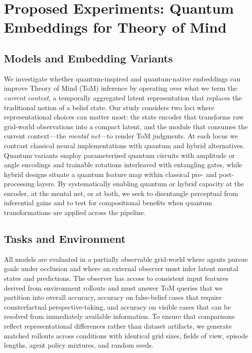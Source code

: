 \section{Proposed Experiments: Quantum Embeddings for Theory of Mind}
\label{sec:experiments}

\subsection{Models and Embedding Variants}
We investigate whether quantum-inspired and quantum-native embeddings can improve Theory of Mind (ToM) inference by operating over what we term the \emph{current context}, a temporally aggregated latent representation that replaces the traditional notion of a belief state. Our study considers two loci where representational choices can matter most: the state encoder that transforms raw grid-world observations into a compact latent, and the module that consumes the current context---the \emph{mental net}---to render ToM judgments. At each locus we contrast classical neural implementations with quantum and hybrid alternatives. Quantum variants employ parameterized quantum circuits with amplitude or angle encodings and trainable rotations interleaved with entangling gates, while hybrid designs situate a quantum feature map within classical pre- and post-processing layers. By systematically enabling quantum or hybrid capacity at the encoder, at the mental net, or at both, we seek to disentangle perceptual from inferential gains and to test for compositional benefits when quantum transformations are applied across the pipeline.

\subsection{Tasks and Environment}
All models are evaluated in a partially observable grid-world where agents pursue goals under occlusion and where an external observer must infer latent mental states and predictions. The observer has access to consistent input features derived from environment rollouts and must answer ToM queries that we partition into overall accuracy, accuracy on false-belief cases that require counterfactual perspective-taking, and accuracy on visible cases that can be resolved from immediately available information. To ensure that comparisons reflect representational differences rather than dataset artifacts, we generate matched rollouts across conditions with identical grid sizes, fields of view, episode lengths, agent policy mixtures, and random seeds.

